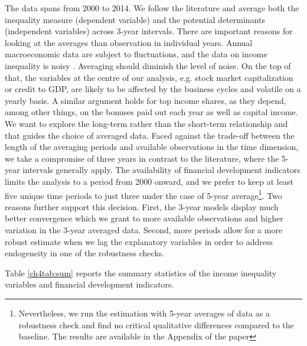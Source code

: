 \begin{refsection}
The data spans from 2000 to 2014. We follow the literature \parencite{dabla2015causes,de2017finance} and average both the inequality measure (dependent variable) and the potential determinants (independent variables) across 3-year intervals. There are important reasons for looking at the averages than observation in individual years. Annual macroeconomic data are subject to fluctuations, and the data on income inequality is noisy \parencite{delis2014}. Averaging should diminish the level of noise. On the top of that, the variables at the centre of our analysis, e.g. stock market capitalization or credit to \ac{GDP}, are likely to be affected by the business cycles and volatile on a yearly basis. A similar argument holds for top income shares, as they depend, among other things, on the bonuses paid out each year as well as capital income. We want to explore the long-term rather than the short-term relationship and that guides the choice of averaged data. Faced against the trade-off between the length of the averaging periods and available observations in the time dimension, we take a compromise of three years in contrast to the literature, where the 5-year intervals generally apply. The availability of financial development indicators limits the analysis to a period from 2000 onward, and we prefer to keep at least five unique time periods to just three under the case of 5-year average\footnote{Nevertheless, we run the estimation with 5-year averages of data as a robustness check and find no critical qualitative differences compared to the baseline. The results are available in the Appendix of the paper}. Two reasons further support this decision. First, the 3-year models display much better convergence which we grant to more available observations and higher variation in the 3-year averaged data. Second, more periods allow for a more robust estimate when we lag the explanatory variables in order to address endogeneity in one of the robustness checks.

Table \ref{ch4tab:sum} reports the summary statistics of the income inequality variables and financial development indicators.



\end{refsection}
